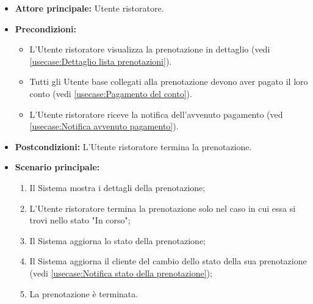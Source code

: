 \label{usecase:Termina prenotazione}
\begin{itemize}
	\item \textbf{Attore principale:} Utente ristoratore.

	\item \textbf{Precondizioni:} 
    \begin{itemize}
        \item L'Utente ristoratore visualizza la prenotazione in dettaglio (vedi \autoref{usecase:Dettaglio lista prenotazioni}).
        \item Tutti gli Utente base collegati alla prenotazione devono aver pagato il loro conto (vedi \autoref{usecase:Pagamento del conto}).
        \item L'Utente ristoratore riceve la notifica dell'avvenuto pagamento (ved \autoref{usecase:Notifica avvenuto pagamento}).
    \end{itemize}

	\item \textbf{Postcondizioni:} L'Utente ristoratore termina la prenotazione.


	\item \textbf{Scenario principale:}
	      \begin{enumerate}
		      \item Il Sistema mostra i dettagli della prenotazione;
		      \item L'Utente ristoratore termina la prenotazione solo nel caso in cui essa si trovi nello stato "In corso";
		      \item Il Sistema aggiorna lo stato della prenotazione;
		      \item Il Sistema aggiorna il cliente del cambio dello stato della sua prenotazione (vedi \autoref{usecase:Notifica stato della prenotazione});
		      \item La prenotazione è terminata.

	      \end{enumerate}
\end{itemize}
